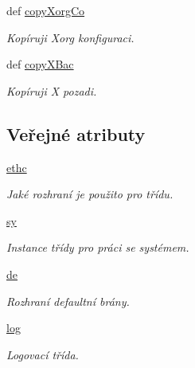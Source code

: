 \begin{DoxyCompactItemize}
def \hyperlink{classConfSys_1_1ConfSys_ac1ae7ecf353bc1fd45635bdca5d7b3bc}{copy\-Xorg\-Co}
\begin{DoxyCompactList}\small\item\em Kopíruji Xorg konfiguraci. \end{DoxyCompactList}\item 
def \hyperlink{classConfSys_1_1ConfSys_a56c578bb874bfb2b0b3da19361ddf84b}{copy\-X\-Bac}
\begin{DoxyCompactList}\small\item\em Kopíruji X pozadi. \end{DoxyCompactList}\end{DoxyCompactItemize}
\subsection*{Veřejné atributy}
\begin{DoxyCompactItemize}
\item 
\hypertarget{classConfSys_1_1ConfSys_a3891a67e1d17ca6f09fdce5900814744}{\hyperlink{classConfSys_1_1ConfSys_a3891a67e1d17ca6f09fdce5900814744}{ethc}}\label{d0/d38/classConfSys_1_1ConfSys_a3891a67e1d17ca6f09fdce5900814744}

\begin{DoxyCompactList}\small\item\em Jaké rozhraní je použito pro třídu. \end{DoxyCompactList}\item 
\hypertarget{classConfSys_1_1ConfSys_a2af86ea0867572d5198dcf34487956cb}{\hyperlink{classConfSys_1_1ConfSys_a2af86ea0867572d5198dcf34487956cb}{sy}}\label{d0/d38/classConfSys_1_1ConfSys_a2af86ea0867572d5198dcf34487956cb}

\begin{DoxyCompactList}\small\item\em Instance třídy pro práci se systémem. \end{DoxyCompactList}\item 
\hypertarget{classConfSys_1_1ConfSys_aa15e4de0e14964b1c7c0c39eb70f4d0d}{\hyperlink{classConfSys_1_1ConfSys_aa15e4de0e14964b1c7c0c39eb70f4d0d}{de}}\label{d0/d38/classConfSys_1_1ConfSys_aa15e4de0e14964b1c7c0c39eb70f4d0d}

\begin{DoxyCompactList}\small\item\em Rozhraní defaultní brány. \end{DoxyCompactList}\item 
\hypertarget{classConfSys_1_1ConfSys_a0e588aeaddcbe3c98a1128c6865d4839}{\hyperlink{classConfSys_1_1ConfSys_a0e588aeaddcbe3c98a1128c6865d4839}{log}}\label{d0/d38/classConfSys_1_1ConfSys_a0e588aeaddcbe3c98a1128c6865d4839}

\begin{DoxyCompactList}\small\item\em Logovací třída. \end{DoxyCompactList}\end{DoxyCompactItemize}


